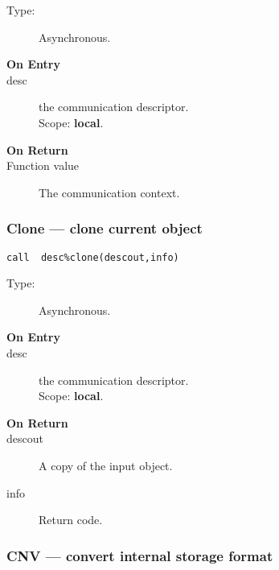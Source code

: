 \begin{description}
\item[Type:] Asynchronous.
\item[\bf On Entry]
\item[desc] the communication descriptor.\\
Scope: {\bf local}.\\
\end{description}

\begin{description}
\item[\bf On Return]
\item[Function value] The communication context.
\end{description}

\subsubsection{Clone --- clone current object}

\begin{verbatim}
call  desc%clone(descout,info)
\end{verbatim}

\begin{description}
\item[Type:] Asynchronous.
\item[\bf On Entry]
\item[desc] the communication descriptor.\\
Scope: {\bf local}.\\
\end{description}

\begin{description}
\item[\bf On Return]
\item[descout] A copy of the input object.
\item[info] Return code. 
\end{description}


\subsubsection{CNV --- convert internal storage format}


